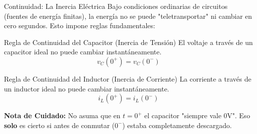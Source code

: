 \documentclass[aspectratio=169, 10pt]{beamer}
\begin{document}
\begin{frame}{Continuidad: La Inercia Eléctrica}
    Bajo condiciones ordinarias de circuitos (fuentes de energía finitas), la energía no se puede "teletransportar" ni cambiar en cero segundos. Esto impone reglas fundamentales:
    \vspace{0.3cm}
    
    \begin{block}{Regla de Continuidad del Capacitor (Inercia de Tensión)}
        El voltaje a través de un capacitor ideal no puede cambiar instantáneamente.
        $$v_C(0^+) = v_C(0^-)$$
    \end{block}
    
    \begin{block}{Regla de Continuidad del Inductor (Inercia de Corriente)}
        La corriente a través de un inductor ideal no puede cambiar instantáneamente.
        $$i_L(0^+) = i_L(0^-)$$
    \end{block}
    
    \vspace{0.2cm}
    \small \textbf{Nota de Cuidado:} No asuma que en $t=0^+$ el capacitor "siempre vale 0V". Eso \textbf{solo} es cierto si antes de conmutar ($0^-$) estaba completamente descargado.
\end{frame}
\end{document}
